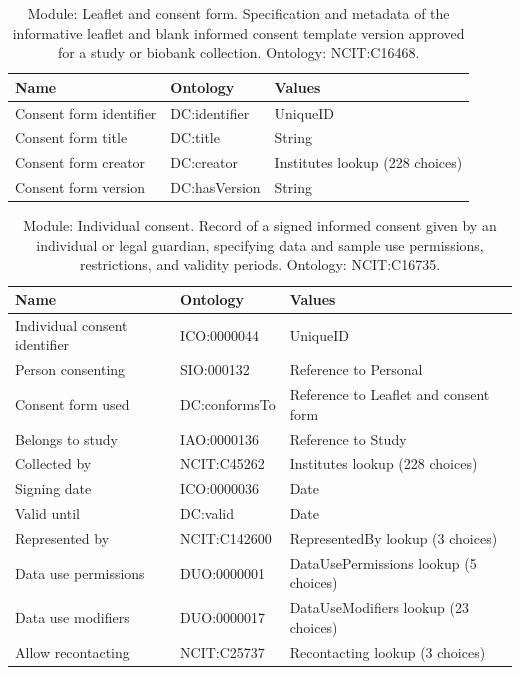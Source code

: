 \documentclass{article}
\begin{document}
\begin{table}[htb]
\begin{tabular}{lll}
Name & Ontology & Values \\
\hline
Consent form identifier & DC:identifier & UniqueID \\
Consent form title & DC:title & String \\
Consent form creator & DC:creator & Institutes lookup (228 choices) \\
Consent form version & DC:hasVersion & String \\
\hline
\end{tabular}
\caption[Module: Leaflet and consent form]{\label{table:table4} Module: Leaflet and consent form. Specification and metadata of the informative leaflet and blank informed consent template version approved for a study or biobank collection. Ontology: NCIT:C16468. }
\end{table}

\begin{table}[htb]
\begin{tabular}{lll}
Name & Ontology & Values \\
\hline
Individual consent identifier & ICO:0000044 & UniqueID \\
Person consenting & SIO:000132 & Reference to Personal \\
Consent form used & DC:conformsTo & Reference to Leaflet and consent form \\
Belongs to study & IAO:0000136 & Reference to Study \\
Collected by & NCIT:C45262 & Institutes lookup (228 choices) \\
Signing date & ICO:0000036 & Date \\
Valid until & DC:valid & Date \\
Represented by & NCIT:C142600 & RepresentedBy lookup (3 choices) \\
Data use permissions & DUO:0000001 & DataUsePermissions lookup (5 choices) \\
Data use modifiers & DUO:0000017 & DataUseModifiers lookup (23 choices) \\
Allow recontacting & NCIT:C25737 & Recontacting lookup (3 choices) \\
\hline
\end{tabular}
\caption[Module: Individual consent]{\label{table:table5} Module: Individual consent. Record of a signed informed consent given by an individual or legal guardian, specifying data and sample use permissions, restrictions, and validity periods. Ontology: NCIT:C16735. }
\end{table}
\end{document}
